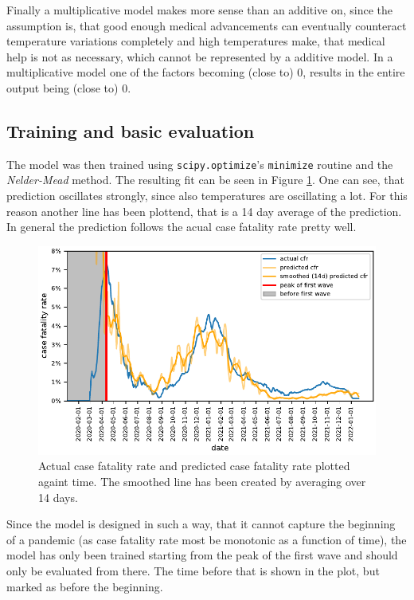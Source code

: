 \documentclass{article}
\begin{document}
Finally a multiplicative model makes more sense than an additive on, since the assumption is, that good enough medical advancements can eventually counteract temperature variations completely and high temperatures make, that medical help is not as necessary, which cannot be represented by a additive model. In a multiplicative model one of the factors becoming (close to) 0, results in the entire output being (close to) 0.

\subsection{Training and basic evaluation}

The model was then trained using \texttt{scipy.optimize}'s \texttt{minimize} routine and the \textit{Nelder-Mead} method. The resulting fit can be seen in Figure \ref{fig:prediction}. One can see, that prediction oscillates strongly, since also temperatures are oscillating a lot. For this reason another line has been plottend, that is a 14 day average of the prediction. In general the prediction follows the acual case fatality rate pretty well.

\begin{figure}[hbt!]
  \begin{center}
    \includegraphics{../fig/prediction.pdf}
    \caption{Actual case fatality rate and predicted case fatality rate plotted againt time. The smoothed line has been created by averaging over 14 days.}
    \label{fig:prediction}
  \end{center}
\end{figure}

Since the model is designed in such a way, that it cannot capture the beginning of a pandemic (as case fatality rate most be monotonic as a function of time), the model has only been trained starting from the peak of the first wave and should only be evaluated from there. The time before that is shown in the plot, but marked as before the beginning. 
\end{document}

